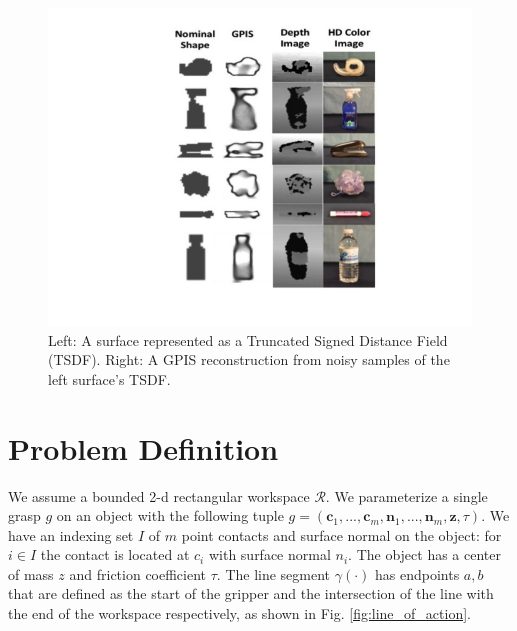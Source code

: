 \documentclass[letterpaper, 10 pt, conference]{ieeeconf}  %
\begin{document}
\begin{figure}[ht!]
\centering
\includegraphics[scale = 0.3]{figures/Slide03.jpg}
\caption{Left: A surface represented as a Truncated Signed Distance Field (TSDF).
Right: A GPIS reconstruction from noisy samples of the left surface's TSDF.}
\vspace*{-10pt}
\label{fig:GPIS_TSDF}
\end{figure}


\section{Problem Definition}


We assume a bounded 2-d rectangular workspace $\mathcal{R}$.
We parameterize a single grasp $g$ on an object with the following tuple $g = ( \textbf{c}_1,...,\textbf{c}_m,\textbf{n}_1,...,\textbf{n}_m,\textbf{z},\tau )$.
We have an indexing set $I$ of $m$ point contacts and surface normal on the object: for $i \in I$ the contact is located at $c_i$ with surface normal $n_i$.
The object has a center of mass $z$ and friction coefficient $\tau$.
The line segment $\gamma(\cdot)$ has endpoints $a,b$ that are defined as the start of the gripper and the intersection of the line with the end of the workspace respectively, as shown in Fig. 
 \ref{fig:line_of_action}.
\end{document}
